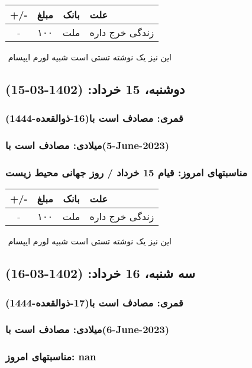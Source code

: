\documentclass{article}
\newcommand{\rnote}[1]{\marginpar{\textcolor{color}{\StrSubstitute{\##1}{ }{\_}}}}
\newcommand{\myRow}[4]{
    #1 & #2 & #3 & #4 \\ \hline
}
\begin{document}
\begin{tabular}{ | c | c | c | p{5cm} |}
    \hline
    \myRow{ +/- }{مبلغ}{بانک}{علت}
    \myRow{-}{۱۰۰}{ملت}{زندگی خرج داره}
\end{tabular}
\newline
\newline

‌
\rnote{تست}
این نیز یک نوشته تستی است شبیه لورم ایپسام




\newpage
{}
\textcolor{color}{
\section{ دوشنبه، 15 خرداد: (1402-03-15) }
\subsubsection*{قمری: مصادف است با(16-ذوالقعده-1444)} 
\subsubsection*{میلادی: مصادف است با(5-June-2023)}
\subsubsection*{مناسبتهای امروز:  قیام 15 خرداد / روز جهانی محیط زیست}
}


\begin{tabular}{ | c | c | c | p{5cm} |}
    \hline
    \myRow{ +/- }{مبلغ}{بانک}{علت}
    \myRow{-}{۱۰۰}{ملت}{زندگی خرج داره}
\end{tabular}
\newline
\newline

‌
\rnote{تست}
این نیز یک نوشته تستی است شبیه لورم ایپسام




\newpage
{}
\textcolor{color}{
\section{ سه شنبه، 16 خرداد: (1402-03-16) }
\subsubsection*{قمری: مصادف است با(17-ذوالقعده-1444)} 
\subsubsection*{میلادی: مصادف است با(6-June-2023)}
\subsubsection*{مناسبتهای امروز: nan}
}
\end{document}
